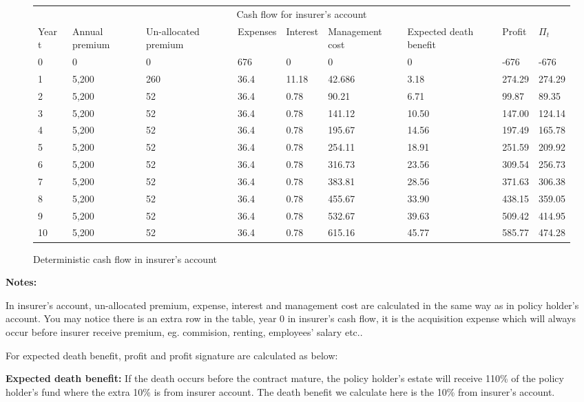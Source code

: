 \documentclass{report}
\begin{document}
\begin{figure}[H]
\hfill
\begin{tabular}{p{0.8cm} p{1.5cm} p{1.5cm} p{1.2cm} p{1cm} p{2cm}p{1.5cm} p{1.5cm} p{1.5cm} }
\toprule
\multicolumn{9}{c}{Cash flow for insurer's account} \\
\cmidrule(r){3-7}

Year t & Annual premium & Un-allocated premium & Expenses & Interest &Management cost& Expected death benefit & Profit& $\Pi_t$  \\
\midrule

0&0&0&676&0&0&0&-676&-676\\
1&5,200&260&36.4&11.18&42.686&3.18&274.29&274.29\\
2&5,200&52&36.4&0.78&90.21&6.71&99.87&89.35\\
3&5,200&52&36.4&0.78&141.12&10.50&147.00&124.14\\
4&5,200&52&36.4&0.78&195.67&14.56&197.49&165.78\\
5&5,200&52&36.4&0.78&254.11&18.91&251.59&209.92\\
6&5,200&52&36.4&0.78&316.73&23.56&309.54&256.73\\
7&5,200&52&36.4&0.78&383.81&28.56&371.63&306.38\\
8&5,200&52&36.4&0.78&455.67&33.90&438.15&359.05\\
9&5,200&52&36.4&0.78&532.67&39.63&509.42&414.95\\
10&5,200&52&36.4&0.78&615.16&45.77&585.77&474.28\\

\bottomrule
\end{tabular}
\caption{Deterministic cash flow in insurer's account}
\label{determ-insurer}
\end{figure}

\textbf{Notes:}

In insurer's account, un-allocated premium, expense, interest and management cost are calculated in the same way as in policy holder's account. You may notice there is an extra row in the table, year 0 in insurer's cash flow, it is the acquisition expense which will always occur before insurer receive premium, eg. commision, renting, employees' salary etc..

For expected death benefit, profit and profit signature are calculated as below:

\textbf{Expected death benefit:} If the death occurs before the contract mature, the policy holder's estate will receive 110\% of the policy holder's fund where the extra 10\% is from insurer account. The death benefit we calculate here is the 10\% from insurer's account. 
\end{document}
